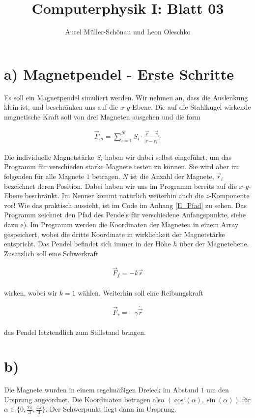 





\title{Computerphysik I: Blatt 03}
\author{Aurel Müller-Schönau und Leon Oleschko}
\maketitle


\section*{a) Magnetpendel - Erste Schritte}
Es soll ein Magnetpendel simuliert werden. Wir nehmen an, dass die Auslenkung klein ist, und beschränken uns auf die $x$-$y$-Ebene. Die auf die Stahlkugel wirkende magnetische Kraft soll von drei Magneten ausgehen und die form

\begin{align}
\vec{F}_m = \sum_{i=1}^N S_i \cdot \frac{\vec{r} - \vec{r}_i}{|r - r_i|^3}
\end{align}

Die individuelle Magnetstärke $S_i$ haben wir dabei selbst eingeführt, um das Programm für verschieden starke Magnete testen zu können. Sie wird aber im folgenden für alle Magnete $1$ betragen. $N$ ist die Anzahl der Magnete, $\vec{r}_i$ bezeichnet deren Position. Dabei haben wir uns im Programm bereits auf die $x$-$y$-Ebene beschränkt. Im Nenner kommt natürlich weiterhin auch die $z$-Komponente vor! Wie das praktisch aussieht, ist im Code im Anhang \ref{E_Pfad} zu sehen. Das Programm zeichnet den Pfad des Pendels für verschiedene Anfangspunkte, siehe dazu e). Im Programm werden die Koordinaten der Magneten in einem Array gespeichert, wobei die dritte Koordinate in wirklichkeit der Magnetstärke entspricht. Das Pendel befindet sich immer in der Höhe $h$ über der Magnetebene.\\
Zusätzlich soll eine Schwerkraft 

\begin{align}
\vec{F}_f = -k \vec{r}
\end{align}
\\
wirken, wobei wir $k=1$ wählen. Weiterhin soll eine Reibungskraft

\begin{align}
\vec{F}_r = -\gamma \dot{\vec{r}}
\end{align}
\\
das Pendel letztendlich zum Stillstand bringen.

\section*{b)}
Die Magnete wurden in einem regelmäßigen Dreieck im Abstand $1$ um den Ursprung angeordnet. Die Koordinaten betragen also $\left(\cos(\alpha), \sin(\alpha)\right)$ für $\alpha \in \{0, \frac{2\pi}{3}, \frac{4\pi}{3}\}$. Der Schwerpunkt liegt dann im Ursprung.

